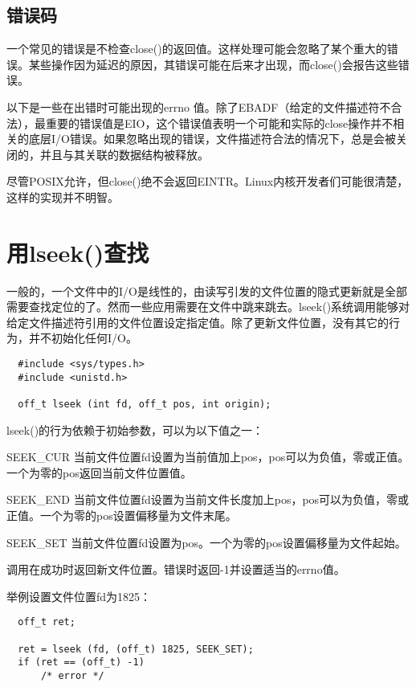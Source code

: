 \subsection{错误码}

一个常见的错误是不检查close()的返回值。这样处理可能会忽略了某个重大的错误。某些操作因为延迟的原因，其错误可能在后来才出现，而close()会报告这些错误。

以下是一些在出错时可能出现的errno 值。除了EBADF（给定的文件描述符不合法），最重要的错误值是EIO，这个错误值表明一个可能和实际的close操作并不相关的底层I/O错误。如果忽略出现的错误，文件描述符合法的情况下，总是会被关闭的，并且与其关联的数据结构被释放。

尽管POSIX允许，但close()绝不会返回EINTR。Linux内核开发者们可能很清楚，这样的实现并不明智。

\section{用lseek()查找}

一般的，一个文件中的I/O是线性的，由读写引发的文件位置的隐式更新就是全部需要查找定位的了。然而一些应用需要在文件中跳来跳去。lseek()系统调用能够对给定文件描述符引用的文件位置设定指定值。除了更新文件位置，没有其它的行为，并不初始化任何I/O。 

\begin{lstlisting}
  #include <sys/types.h>
  #include <unistd.h>

  off_t lseek (int fd, off_t pos, int origin);
\end{lstlisting}

lseek()的行为依赖于初始参数，可以为以下值之一：
\begin{eqlist*}
\item [SEEK\_CUR]
当前文件位置fd设置为当前值加上pos，pos可以为负值，零或正值。一个为零的pos返回当前文件位置值。
\item [SEEK\_END]
当前文件位置fd设置为当前文件长度加上pos，pos可以为负值，零或正值。一个为零的pos设置偏移量为文件末尾。
\item [SEEK\_SET]
当前文件位置fd设置为pos。一个为零的pos设置偏移量为文件起始。
\end{eqlist*}

调用在成功时返回新文件位置。错误时返回-1并设置适当的errno值。

举例设置文件位置fd为1825： 

\begin{lstlisting}
  off_t ret;

  ret = lseek (fd, (off_t) 1825, SEEK_SET);
  if (ret == (off_t) -1)
      /* error */
\end{lstlisting}


